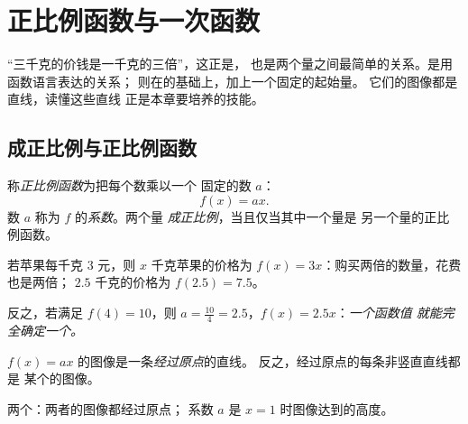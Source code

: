\chapter{正比例函数与一次函数}\label{ch:g9:linfunc}

“三千克的价钱是一千克的三倍”，这正是，
也是两个量之间最简单的关系。是用函数语言表达的关系；
则在的基础上，加上一个固定的起始量。
它们的图像都是直线，读懂这些直线
正是本章要培养的技能。

\section{成正比例与正比例函数}

\begin{definition}[正比例函数]\label{def:g9:linfunc:linear}
称\emph{正比例函数}为把每个数乘以一个
固定的数 $a$：
\[
f(x) = a x .
\]
数 $a$ 称为 $f$ 的\emph{系数}。两个量
\emph{成正比例}，当且仅当其中一个量是
另一个量的正比例函数。
\end{definition}

\begin{example}\label{ex:g9:linfunc:linear}
若苹果每千克 $3$ 元，则 $x$ 千克苹果的价格为
$f(x) = 3x$：购买两倍的数量，花费也是两倍；
$2.5$ 千克的价格为 $f(2.5) = 7.5$。

反之，若满足 $f(4) = 10$，则
$a = \frac{10}{4} = 2.5$，$f(x) = 2.5x$：\emph{一个函数值
就能完全确定一个。}
\end{example}

\begin{proposition}[正比例函数的图像]\label{prop:g9:linfunc:lineargraph}
$f(x) = ax$ 的图像是一条\emph{经过原点}的直线。
反之，经过原点的每条非竖直直线都是
某个的图像。
\end{proposition}
\admitted

\begin{omfigure}

{\small 两个：两者的图像都经过原点；
系数 $a$ 是 $x = 1$ 时图像达到的高度。}
\end{omfigure}


